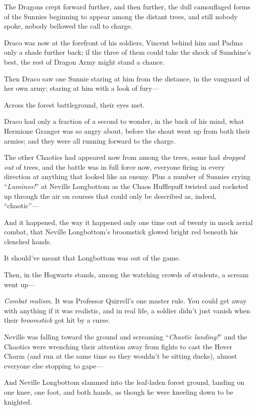 The Dragons crept forward further, and then further, the dull camouflaged forms of the Sunnies beginning to appear among the distant trees, and still nobody spoke, nobody bellowed the call to charge.

Draco was now at the forefront of his soldiers, Vincent behind him and Padma only a shade further back; if the three of them could take the shock of Sunshine’s best, the rest of Dragon Army might stand a chance.

Then Draco saw one Sunnie staring at him from the distance, in the vanguard of her own army; staring at him with a look of fury—

Across the forest battleground, their eyes met.

Draco had only a fraction of a second to wonder, in the back of his mind, what Hermione Granger was so angry about, before the shout went up from both their armies; and they were all running forward to the charge.

\later

The other Chaotics had appeared now from among the trees, some had \emph{dropped out} of trees, and the battle was in full force now, everyone firing in every direction at anything that looked like an enemy. Plus a number of Sunnies crying “\emph{Luminos!}” at Neville Longbottom as the Chaos Hufflepuff twisted and rocketed up through the air on courses that could only be described as, indeed, “chaotic”—

And it happened, the way it happened only one time out of twenty in mock aerial combat, that Neville Longbottom’s broomstick glowed bright red beneath his clenched hands.

It should’ve meant that Longbottom was out of the game.

Then, in the Hogwarts stands, among the watching crowds of students, a scream went up—

\emph{Combat realism.} It was Professor Quirrell’s one master rule. You could get away with anything if it was realistic, and in real life, a soldier didn’t just vanish when their \emph{broomstick} got hit by a curse.

Neville was falling toward the ground and screaming “\emph{Chaotic landing!}” and the Chaotics were wrenching their attention away from fights to cast the Hover Charm (and run at the same time so they wouldn’t be sitting ducks), almost everyone else stopping to gape—

And Neville Longbottom slammed into the leaf-laden forest ground, landing on one knee, one foot, and both hands, as though he were kneeling down to be knighted.

